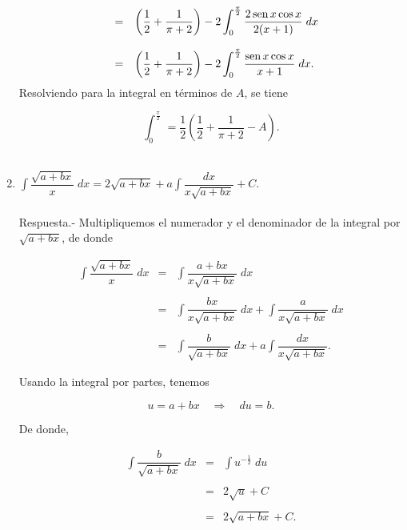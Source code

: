 \begin{enumerate}[\bfseries 1.]
	$$
	\begin{array}{rcl}
	    &=& \left(\dfrac{1}{2}+\dfrac{1}{\pi+2}\right)-2\displaystyle\int_0^{\frac{\pi}{2}} \dfrac{2\mathop{\mbox{\normalfont sen}}\nolimits x\cos x}{2(x+1)}\; dx\\\\
	    &=& \left(\dfrac{1}{2}+\dfrac{1}{\pi+2}\right)-2\displaystyle\int_0^{\frac{\pi}{2}} \dfrac{\mathop{\mbox{\normalfont sen}}\nolimits x\cos x}{x+1}\; dx.
	\end{array}
	$$
	Resolviendo para la integral en términos de $A$, se tiene 

	$$\int_0^{\frac{\pi}{2}}\dfrac{}{}=\dfrac{1}{2}\left(\dfrac{1}{2}+\dfrac{1}{\pi+2}-A\right).$$\\

    \item $\displaystyle\int \dfrac{\sqrt{a+bx}}{x}\; dx = 2\sqrt{a+bx}+a\int \dfrac{dx}{x\sqrt{a+bx}}+C$.\\\\
	Respuesta.-\; Multipliquemos el numerador y el denominador de la integral por $\sqrt{a+bx}$, de donde

	$$
	\begin{array}{rcl}
	    \displaystyle\int \dfrac{\sqrt{a+bx}}{x}\; dx &=& \displaystyle\int \dfrac{a+bx}{x\sqrt{a+bx}}\; dx\\\\
							 &=& \displaystyle\int \dfrac{bx}{x\sqrt{a+bx}}\; dx + \displaystyle\int \dfrac{a}{x\sqrt{a+bx}}\; dx\\\\
							 &=& \displaystyle\int \dfrac{b}{\sqrt{a+bx}}\; dx+a\displaystyle\int \dfrac{dx}{x\sqrt{a+bx}}.
	\end{array}
	$$

	Usando la integral por partes, tenemos

	$$u=a+bx\quad \Rightarrow\quad du=b.$$

	De donde,

	$$
	\begin{array}{rcl}
	    \displaystyle\int \dfrac{b}{\sqrt{a+bx}}\; dx &=& \displaystyle\int u^{-\frac{1}{2}}\; du \\\\
							  &=& 2\sqrt{u}+C\\\\
							  &=& 2\sqrt{a+bx}+C.
	\end{array}
	$$
	\vspace{0.5cm}


\end{enumerate}
